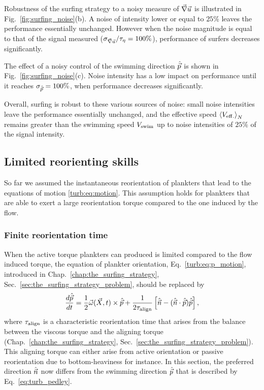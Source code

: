 Robustness of the surfing strategy to a noisy measure of $\vec{\nabla} \vec{u}$ is illustrated in Fig.~\ref{fig:surfing_noise}(b).
A noise of intensity lower or equal to $25\%$ leaves the performance essentially unchanged. 
However when the noise magnitude is equal to that of the signal measured ($\sigma_{\vec{\nabla} \vec{u}}/\tau_{\eta} = 100\%$), performance of surfers decreases significantly.

The effect of a noisy control of the swimming direction $\hat{\vec{p}}$ is shown in Fig.~\ref{fig:surfing_noise}(c).
Noise intensity has a low impact on performance until it reaches $\sigma_{\hat{\vec{p}}} = 100\%$, when performance decreases significantly.

Overall, surfing is robust to these various sources of noise: small noise intensities leave the performance essentially unchanged, and the effective speed $\left\langle V_{\mathrm{eff.}} \right\rangle_N$ remains greater than the swimming speed $V_{\mathrm{swim}}$ up to noise intensities of $25\%$ of the signal intensity.

\subsection{Limited reorienting skills}\label{sec:surfing_on_turbulence_rtime}

So far we assumed the instantaneous reorientation of plankters that lead to the equations of motion \eqref{turb:eq:motion}.
This assumption holds for plankters that are able to exert a large reorientation torque compared to the one induced by the flow.

\subsubsection{Finite reorientation time}

When the active torque plankters can produced is limited compared to the flow induced torque, the equation of plankter orientation, Eq.~\eqref{turb:eq:p_motion}, introduced in Chap.~\ref{chap:the_surfing_strategy}, Sec.~\ref{sec:the_surfing_strategy_problem}, should be replaced by \citep{Pedley1992}
\begin{equation}\label{eq:turb_pedley}
		\frac{d \hat{\vec{p}}}{d t}  =
		\frac{1}{2} \vec{\omega} (\vec{X}, t) \times \hat{\vec{p}} + \frac{1}{2 \tau_{\mathrm{align}}} \left[ \hat{\vec{n}} - (\hat{\vec{n}} \cdot \hat{\vec{p}}) \hat{\vec{p}} \right],
\end{equation}
where $\tau_{\mathrm{align}}$ is a characteristic reorientation time that arises from the balance between the viscous torque and the aligning torque (Chap.~\ref{chap:the_surfing_strategy}, Sec.~\ref{sec:the_surfing_strategy_problem}).
This aligning torque can either arise from active orientation or passive reorientation due to bottom-heaviness for instance.
In this section, the preferred direction $\hat{\vec{n}}$ now differs from the swimming direction $\hat{\vec{p}}$ that is described by Eq.~\eqref{eq:turb_pedley}.

